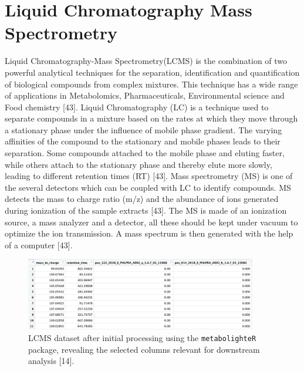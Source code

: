 \documentclass[12pt,a4paper]{report}
\begin{document}
\section{Liquid Chromatography Mass Spectrometry}
Liquid Chromatography-Mass Spectrometry(LCMS) is the combination of two powerful analytical techniques for the separation, identification and quantification of biological compounds from complex mixtures. This technique has a wide range of applications in Metabolomics, Pharmaceuticals, Environmental science and Food chemistry [43]. Liquid Chromatography (LC) 
is a technique used to separate compounds in a mixture based on the rates at which they move through a stationary phase under the influence of mobile phase gradient. The varying affinities of the compound to the stationary and mobile phases leads to their separation. Some compounds attached to the mobile phase and eluting faster, while others attach to 
the stationary phase and thereby elute more slowly, leading to different retention times (RT) [43]. Mass spectrometry (MS) is one of the several detectors which can be coupled with LC to identify compounds. MS detects the mass to charge ratio (m/z) and the abundance of ions generated during ionization of the sample extracts [43]. The MS is made of an ionization source, a mass analyzer and a detector, all these should be kept under vacuum to optimize the ion transmission. A mass spectrum is then generated with the help of a computer [43]. \\

\begin{figure}[h]
    \centering
    \includegraphics[width=0.9\textwidth]{Figures/lcms_raw.png} 
    \caption{LCMS dataset after initial processing using the \texttt{metabolighteR} package, revealing the selected columns relevant for downstream analysis [14].}
    \label{fig:lcms_raw}
\end{figure}
\end{document}
